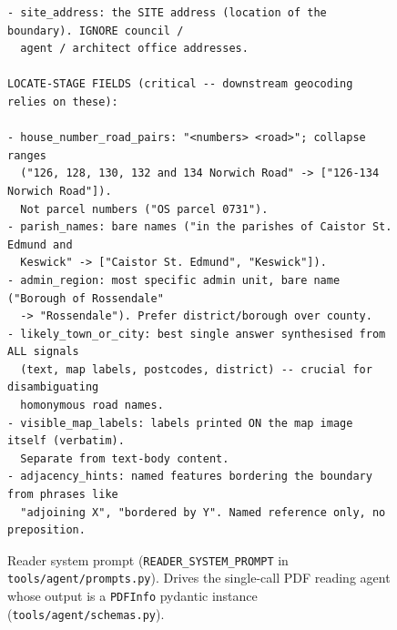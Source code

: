 \documentclass[11pt]{article}
\begin{document}
\begin{figure}[t]
\begin{Verbatim}[frame=single,fontsize=\footnotesize,breaklines=true,breakanywhere=true,xleftmargin=4pt,xrightmargin=4pt]
- site_address: the SITE address (location of the boundary). IGNORE council /
  agent / architect office addresses.

LOCATE-STAGE FIELDS (critical -- downstream geocoding relies on these):

- house_number_road_pairs: "<numbers> <road>"; collapse ranges
  ("126, 128, 130, 132 and 134 Norwich Road" -> ["126-134 Norwich Road"]).
  Not parcel numbers ("OS parcel 0731").
- parish_names: bare names ("in the parishes of Caistor St. Edmund and
  Keswick" -> ["Caistor St. Edmund", "Keswick"]).
- admin_region: most specific admin unit, bare name ("Borough of Rossendale"
  -> "Rossendale"). Prefer district/borough over county.
- likely_town_or_city: best single answer synthesised from ALL signals
  (text, map labels, postcodes, district) -- crucial for disambiguating
  homonymous road names.
- visible_map_labels: labels printed ON the map image itself (verbatim).
  Separate from text-body content.
- adjacency_hints: named features bordering the boundary from phrases like
  "adjoining X", "bordered by Y". Named reference only, no preposition.
\end{Verbatim}
\caption{Reader system prompt (\texttt{READER\_SYSTEM\_PROMPT} in \texttt{tools/agent/prompts.py}). Drives the single-call PDF reading agent whose output is a \texttt{PDFInfo} pydantic instance (\texttt{tools/agent/schemas.py}).}
\label{fig:reader-prompt}
\end{figure}
\end{document}
